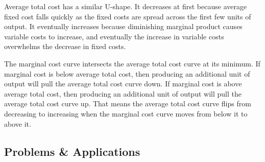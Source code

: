 \documentclass{article}
\begin{document}
\begin{enumerate}
Average total cost has a similar U-shape. It decreases at first because average fixed cost falls quickly as the fixed costs are spread across the first few units of output. It eventually increases because diminishing marginal product causes variable costs to increase, and eventually the increase in variable costs overwhelms the decrease in fixed costs. 

The marginal cost curve intersects the average total cost curve at its minimum. If marginal cost is below average total cost, then producing an additional unit of output will pull the average total cost curve down. If marginal cost is above average total cost, then producing an additional unit of output will pull the average total cost curve up. That means the average total cost curve flips from decreasing to increasing when the marginal cost curve moves from below it to above it.

 

\end{enumerate}

\subsection*{Problems \& Applications}
\end{document}
